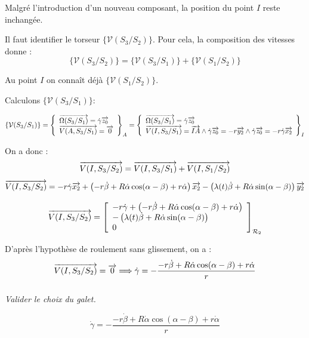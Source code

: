 \documentclass[10pt,fleqn]{article} %
\begin{document}
\begin{multicols}{2}
\begin{corrige}
Malgré l'introduction d'un nouveau composant, la position du point $I$ reste inchangée.

Il faut identifier le torseur $\{\mathcal{V}(S_3/S_2)\}$. 
Pour cela, la composition des vitesses donne :
$$
\{\mathcal{V}(S_3/S_2)\} = \{\mathcal{V}(S_3/S_1)\} + \{\mathcal{V}(S_1/S_2)\}  
$$


Au point $I$ on connaît déjà $\{\mathcal{V}(S_1/S_2)\}$.

Calculons $\{\mathcal{V}(S_3/S_1)\}$:

$$
\{\mathcal{V}(S_3/S_1)\}
= 
\left\{
\begin{array}{l}
\overrightarrow{\Omega(S_3/S_1)} = \dot{\gamma}\overrightarrow{z_0} \\
\overrightarrow{V(A,S_3/S_1)} = \overrightarrow{0}
\end{array}
\right\}_A =
\left\{
\begin{array}{l}
\overrightarrow{\Omega(S_3/S_1)} = \dot{\gamma}\overrightarrow{z_0} \\
\overrightarrow{V(I,S_3/S_1)} = \overrightarrow{IA} \wedge \dot{\gamma}\overrightarrow{z_0}
= -r\overrightarrow{y_2} \wedge \dot{\gamma}\overrightarrow{z_0} = -r \dot{\gamma}\overrightarrow{x_2}
\end{array}
\right\}_I
$$

On a donc :
$$
\overrightarrow{V(I,S_3/S_2)} = \overrightarrow{V(I,S_3/S_1)} + \overrightarrow{V(I,S_1/S_2)} 
$$
$$
\overrightarrow{V(I,S_3/S_2)} = -r \dot{\gamma}\overrightarrow{x_2} 
+\left(-r\dot{\beta}+ R\dot{\alpha}\cos(\alpha-\beta) + r\dot{\alpha}\right)\overrightarrow{x_2}
- \left(\lambda(t) \dot{\beta}+  R\dot{\alpha}\sin(\alpha-\beta)\right)\overrightarrow{y_2}
$$


$$
\overrightarrow{V(I,S_3/S_2)} =\left[ 
\begin{array}{l}
 -r \dot{\gamma}+\left(-r\dot{\beta}+ R\dot{\alpha}\cos(\alpha-\beta) + r\dot{\alpha}\right)\\
- \left(\lambda(t) \dot{\beta}+  R\dot{\alpha}\sin(\alpha-\beta)\right)\\
0\\
\end{array}
\right]_{\mathcal{R}_2}  
$$



D'après l'hypothèse de roulement sans glissement, on a :
$$ 
\overrightarrow{V(I,S_3/S_2)} = \overrightarrow{0} \Longrightarrow  \dot{\gamma}=-\dfrac{-r\dot{\beta}+ R\dot{\alpha}\cos(\alpha-\beta) + r\dot{\alpha}}{r}
$$

\end{corrige}
\else \fi

\subparagraph{}
\textit{Valider le choix du galet.}
\ifprof%
\begin{corrige}

$$
 \dot{\gamma}=-\dfrac{-r\dot{\beta}+ R\dot{\alpha}\cos(\alpha-\beta) + r\dot{\alpha}}{r}
$$
\end{corrige}\else\fi





\ifprof
\else
\end{multicols}
\fi

\end{document}
